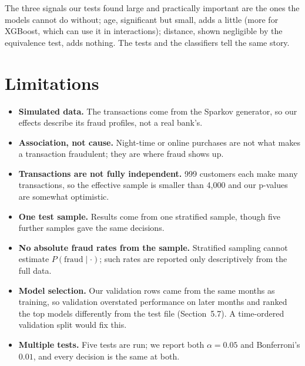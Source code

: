 \documentclass[10pt,a4paper,twocolumn]{article}
\begin{document}
The three signals our tests found large and practically important are the ones the models cannot
do without; age, significant but small, adds a little (more for XGBoost, which can use it in
interactions); distance, shown negligible by the equivalence test, adds nothing. The tests and the
classifiers tell the same story.

\section{Limitations}

\begin{itemize}
  \item \textbf{Simulated data.} The transactions come from the Sparkov generator, so our effects
  describe its fraud profiles, not a real bank's.
  \item \textbf{Association, not cause.} Night-time or online purchases are not what makes a
  transaction fraudulent; they are where fraud shows up.
  \item \textbf{Transactions are not fully independent.} 999 customers each make many transactions,
  so the effective sample is smaller than 4{,}000 and our p-values are somewhat optimistic.
  \item \textbf{One test sample.} Results come from one stratified sample, though five further
  samples gave the same decisions.
  \item \textbf{No absolute fraud rates from the sample.} Stratified sampling cannot estimate
  $P(\text{fraud}\mid\cdot)$; such rates are reported only descriptively from the full data.
  \item \textbf{Model selection.} Our validation rows came from the same months as training, so
  validation overstated performance on later months and ranked the top models differently from
  the test file (Section~5.7). A time-ordered validation split would fix this.
  \item \textbf{Multiple tests.} Five tests are run; we report both $\alpha=0.05$ and Bonferroni's
  $0.01$, and every decision is the same at both.
\end{itemize}
\end{document}
